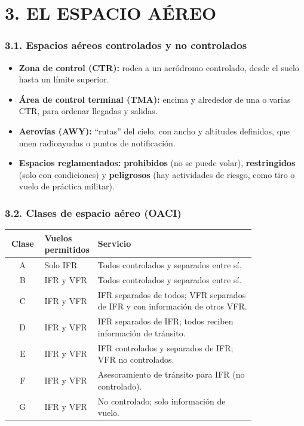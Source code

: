 \section*{3. EL ESPACIO AÉREO}

\subsubsection*{3.1. Espacios aéreos controlados y no controlados}
\begin{itemize}
  \item \textbf{Zona de control (CTR):} rodea a un aeródromo controlado, desde el suelo hasta un
        límite superior.
  \item \textbf{Área de control terminal (TMA):} encima y alrededor de una o varias CTR, para
        ordenar llegadas y salidas.
  \item \textbf{Aerovías (AWY):} ``rutas'' del cielo, con ancho y altitudes definidos, que unen
        radioayudas o puntos de notificación.
  \item \textbf{Espacios reglamentados:} \textbf{prohibidos} (no se puede volar),
        \textbf{restringidos} (solo con condiciones) y \textbf{peligrosos} (hay actividades de
        riesgo, como tiro o vuelo de práctica militar).
\end{itemize}

\subsubsection*{3.2. Clases de espacio aéreo (OACI)}
\begin{center}
\small
\begin{tabular}{|c|p{0.18\linewidth}|p{0.64\linewidth}|}
\hline
\textbf{Clase} & \textbf{Vuelos permitidos} & \textbf{Servicio} \\ \hline
A & Solo IFR & Todos controlados y separados entre sí. \\ \hline
B & IFR y VFR & Todos controlados y separados entre sí. \\ \hline
C & IFR y VFR & IFR separados de todos; VFR separados de IFR y con información de otros VFR. \\
\hline
D & IFR y VFR & IFR separados de IFR; todos reciben información de tránsito. \\ \hline
E & IFR y VFR & IFR controlados y separados de IFR; VFR no controlados. \\ \hline
F & IFR y VFR & Asesoramiento de tránsito para IFR (no controlado). \\ \hline
G & IFR y VFR & No controlado; solo información de vuelo. \\ \hline
\end{tabular}
\end{center}


